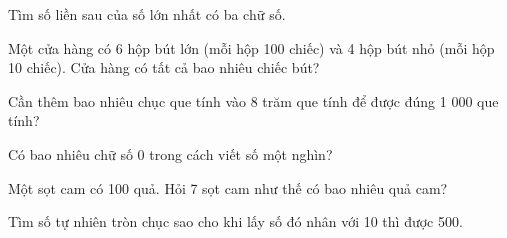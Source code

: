 \begin{ex} %
Tìm số liền sau của số lớn nhất có ba chữ số.
\end{ex}

\begin{ex} %
Một cửa hàng có 6 hộp bút lớn (mỗi hộp 100 chiếc) và 4 hộp bút nhỏ (mỗi hộp 10 chiếc). Cửa hàng có tất cả bao nhiêu chiếc bút?
\end{ex}

\begin{ex} %
Cần thêm bao nhiêu chục que tính vào 8 trăm que tính để được đúng 1 000 que tính?
\end{ex}

\begin{ex} %
Có bao nhiêu chữ số 0 trong cách viết số một nghìn?
\end{ex}

\begin{ex} %
Một sọt cam có 100 quả. Hỏi 7 sọt cam như thế có bao nhiêu quả cam?
\end{ex}

\begin{ex} %
Tìm số tự nhiên tròn chục sao cho khi lấy số đó nhân với 10 thì được 500.
\end{ex}

